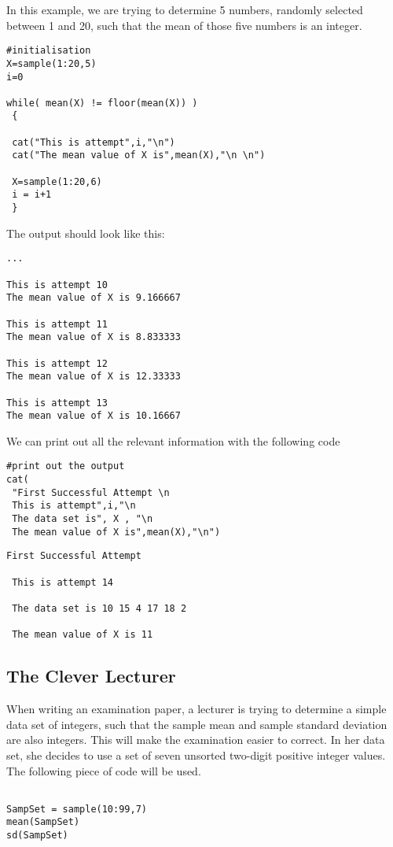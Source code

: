\documentclass[a4paper,12pt]{article}
\begin{document}
In this example, we are trying to determine 5 numbers, randomly selected between 1 and 20, such that the mean of those five numbers is an integer.
\begin{framed}
\begin{verbatim}
#initialisation
X=sample(1:20,5)
i=0

while( mean(X) != floor(mean(X)) )
 {
 
 cat("This is attempt",i,"\n")
 cat("The mean value of X is",mean(X),"\n \n")

 X=sample(1:20,6)
 i = i+1
 }
\end{verbatim}
\end{framed}


The output should look like this:
\begin{verbatim}
...

This is attempt 10 
The mean value of X is 9.166667 
 
This is attempt 11 
The mean value of X is 8.833333 
 
This is attempt 12 
The mean value of X is 12.33333 
 
This is attempt 13 
The mean value of X is 10.16667 
\end{verbatim}

We can print out all the relevant information with the following code
\begin{framed}
\begin{verbatim}
#print out the output
cat(
 "First Successful Attempt \n 
 This is attempt",i,"\n
 The data set is", X , "\n
 The mean value of X is",mean(X),"\n")
\end{verbatim}
\end{framed}

\begin{verbatim}
First Successful Attempt 
 
 This is attempt 14 

 The data set is 10 15 4 17 18 2 

 The mean value of X is 11 

\end{verbatim}



\subsection{The Clever Lecturer}
When writing an examination paper, a lecturer is trying to determine a simple data set of integers, such that the sample mean and sample standard deviation are also integers. This will make the examination easier to correct. In her data set, she decides to use a set of seven unsorted two-digit positive integer values.
The following piece of code will be used.
\begin{framed}
\begin{verbatim}

SampSet = sample(10:99,7)
mean(SampSet)
sd(SampSet)

\end{verbatim}
\end{framed}
\end{document}

